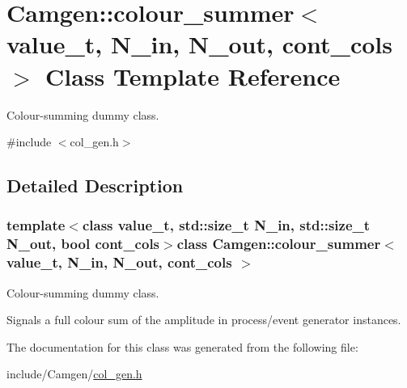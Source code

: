 \hypertarget{a00092}{\section{Camgen\-:\-:colour\-\_\-summer$<$ value\-\_\-t, N\-\_\-in, N\-\_\-out, cont\-\_\-cols $>$ Class Template Reference}
\label{a00092}
}


Colour-\/summing dummy class.  




{\ttfamily \#include $<$col\-\_\-gen.\-h$>$}



\subsection{Detailed Description}
\subsubsection*{template$<$class value\-\_\-t, std\-::size\-\_\-t N\-\_\-in, std\-::size\-\_\-t N\-\_\-out, bool cont\-\_\-cols$>$class Camgen\-::colour\-\_\-summer$<$ value\-\_\-t, N\-\_\-in, N\-\_\-out, cont\-\_\-cols $>$}

Colour-\/summing dummy class. 

Signals a full colour sum of the amplitude in process/event generator instances. 

The documentation for this class was generated from the following file\-:\begin{DoxyCompactItemize}
\item 
include/\-Camgen/\hyperlink{a00593}{col\-\_\-gen.\-h}\end{DoxyCompactItemize}
